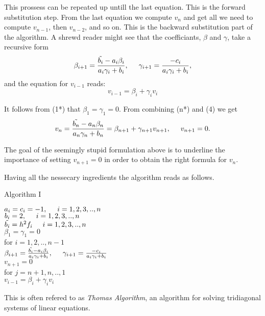 \documentclass[11pt,a4paper,english]{article}
\begin{document}
This prossess can be repeated up untill the last equation. This is the forward substitution step. From the last equation we compute $v_n$ and get all we need to compute $v_{n-1}$, then $v_{n-2}$, and so on. This is the backward substitution part of the algorithm. A shrewd reader might see that the coefficiants, $\beta$ and $\gamma$, take a recursive form
\begin{align*}
\beta_{i+1} = \frac{\tilde{b_i}-a_i \beta_i}{a_i \gamma_i + b_i} , \hspace{0.5cm} \gamma_{i+1}=\frac{-c_i}{a_i \gamma_i + b_i},
\end{align*}
and the equation for $v_{i-1}$ reads: 
\begin{equation}
v_{i-1} = \beta_i + \gamma_i v_i
\end{equation}

It follows from (1*) that $\beta_1 = \gamma_1 = 0$.
From combining (n*) and (4) we get 
\begin{align*}
v_n = \frac{\tilde{b_n}-a_n \beta_n}{a_n \gamma_n + b_n} = \beta_{n+1} + \gamma_{n+1} v_{n+1}, \hspace{0.5cm} v_{n+1} = 0.
\end{align*}

The goal of the seemingly stupid formulation above is to underline the importance of setting $v_{n+1}=0$ in order to obtain the right formula for $v_n$.

Having all the nessecary ingredients the algorithm reads as follows.
\vspace{0.5cm}\\
\centerline{Algorithm I}
\begin{tcolorbox}
$a_i = c_i = -1, \hspace{0.5cm}  i=1,2,3,..,n$ \\
$b_i = 2, \hspace{0.5cm}  i=1,2,3,..,n $\\
$\tilde{b_i} = h^2 f_i \hspace{0.5cm}  i=1,2,3,..,n $ \\
$\beta_1 = \gamma_1 = 0$ \\
for $i=1,2,..,n-1$ \\ \vspace{0.5cm} 
 \hspace{0.5cm} $ \beta_{i+1} = \frac{\tilde{b_i}-a_i \beta_i}{a_i \gamma_i + b_i} , \hspace{0.5cm} \gamma_{i+1}=\frac{-c_i}{a_i \gamma_i + b_i} $ \vspace{0.2cm}  \\
 $v_{n+1} = 0$ \\
for $j=n+1, n,..,1$ \\ \vspace{0.5cm} 
 \hspace{0.5cm} $v_{i-1} = \beta_i + \gamma_i v_i$

\end{tcolorbox} 


This is often refered to as \emph{Thomas Algorithm}, an algorithm for solving tridiagonal systems of linear equations.
\end{document}
